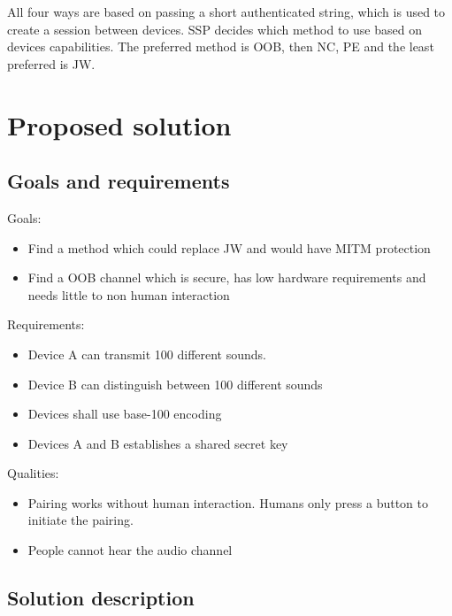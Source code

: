 \documentclass[12pt]{article}
\begin{document}
All four ways are based on passing a short authenticated string, which is used to create a session between devices. SSP decides which method to use based on devices capabilities. The preferred method is  OOB, then NC, PE and the least preferred is JW.

\newpage

\section{Proposed solution}
\label{sec:Proposed solution}

\subsection{Goals and requirements}
\label{sub:Goals and requirements}

Goals:

\begin{itemize}
    \item Find a method which could replace JW and would have MITM protection
    \item Find a OOB channel which is secure, has low hardware requirements and needs little to non human interaction
\end{itemize}

Requirements:

\begin{itemize}
    \item Device A can transmit 100 different sounds.
    \item Device B can distinguish between 100 different sounds
    \item Devices shall use base-100 encoding
    \item Devices A and B establishes a shared secret key
\end{itemize}

Qualities:

\begin{itemize}
    \item Pairing works without human interaction. Humans only press a button to initiate the pairing.
    \item People cannot hear the audio channel
\end{itemize}

\subsection{Solution description}
\label{sub:Solution description}
\end{document}
